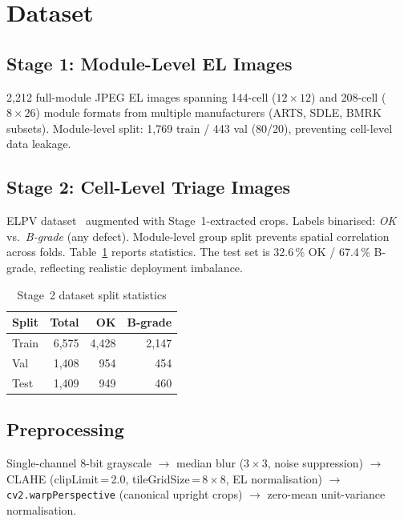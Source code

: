 \documentclass[conference]{IEEEtran}
\begin{document}
\section{Dataset}
\label{sec:dataset}

\subsection{Stage 1: Module-Level EL Images}
2{,}212 full-module JPEG EL images spanning 144-cell ($12\times12$) and 208-cell ($8\times26$) module formats from multiple manufacturers (ARTS, SDLE, BMRK subsets). Module-level split: 1{,}769 train / 443 val (80/20), preventing cell-level data leakage.

\subsection{Stage 2: Cell-Level Triage Images}
ELPV dataset~\cite{deitsch2019} augmented with Stage~1-extracted crops. Labels binarised: \textit{OK} vs.\ \textit{B-grade} (any defect). Module-level group split prevents spatial correlation across folds. Table~\ref{tab:datasplit} reports statistics. The test set is 32.6\,\% OK / 67.4\,\% B-grade, reflecting realistic deployment imbalance.

\begin{table}[t]
  \caption{Stage~2 dataset split statistics}
  \label{tab:datasplit}
  \begin{center}
  \renewcommand{\arraystretch}{1.05}\small
  \begin{tabular}{lrrr}
    \toprule
    \textbf{Split} & \textbf{Total} & \textbf{OK} & \textbf{B-grade}\\
    \midrule
    Train & 6{,}575 & 4{,}428 & 2{,}147\\
    Val   & 1{,}408 &   954   &   454\\
    Test  & 1{,}409 &   949   &   460\\
    \bottomrule
  \end{tabular}
  \end{center}
\end{table}

\subsection{Preprocessing}
Single-channel 8-bit grayscale $\to$ median blur ($3\times3$, noise suppression) $\to$ CLAHE (clipLimit\,=\,2.0, tileGridSize\,=\,$8\times8$, EL normalisation) $\to$ \texttt{cv2.warpPerspective} (canonical upright crops) $\to$ zero-mean unit-variance normalisation.
\end{document}
